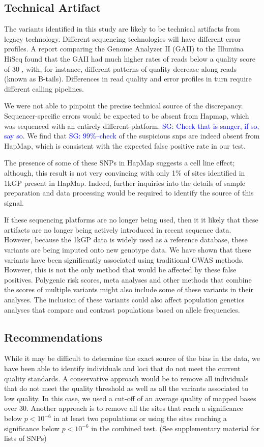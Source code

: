 \documentclass[9pt,lineno]{elife}
\newcommand{\sgcomment}[1]{\textcolor{blue}{SG: #1}}
\begin{document}
\subsection{Technical Artifact}
The variants identified in this study are likely to be technical artifacts from legacy technology.
Different sequencing technologies will have different error profiles. 
A report comparing the Genome Analyzer II (GAII) to the Illumina HiSeq found that the GAII had much higher rates of reads below a quality score of 30 \citep{Minoche2011}, with, for instance, different patterns of quality decrease along reads (known as B-tails). 
Differences in read quality and error profiles in turn require different calling pipelines.

We were not able to pinpoint the precise technical source of the discrepancy. Sequencer-specific errors would be expected to be absent from Hapmap, which was sequenced with an entirely different platform. \sgcomment{Check that is sanger, if so, say so}. We find that \sgcomment{$99\%$--check} of the suspicious snps are indeed absent from HapMap, which is consistent with the expected false positive rate in our test.   
  
The presence of some of these SNPs in HapMap suggests a cell line effect; although, this result is not very convincing with only 1\% of sites identified in 1kGP present in HapMap.
Indeed, further inquiries into the details of sample preparation and data processing would be required to identify the source of this signal. 

If these sequencing platforms are no longer being used, then it it likely that these artifacts are no longer being actively introduced in recent sequence data.
However, because the 1kGP data is widely used as a reference database, these variants are being imputed onto new genotype data.
We have shown that these variants have been significantly associated using traditional GWAS methods.
However, this is not the only method that would be affected by these false positives. 
Polygenic risk scores, meta analyses and other methods that combine the scores of multiple variants might also include some of these variants in their analyses.
The inclusion of these variants could also affect population genetics analyses that compare and contrast populations based on allele frequencies.


\subsection{Recommendations}
While it may be difficult to determine the exact source of the bias in the data, we have been able to identify individuals and loci that do not meet the current quality standards.
A conservative approach would be to remove all individuals that do not meet the quality threshold as well as all the variants associated to low quality.
In this case, we used a cut-off of an average quality of mapped bases over 30.
Another approach is to remove all the sites that reach a significance below $ p < 10^{-6}$ in at least two populations or using the sites reaching a significance below $ p < 10^{-6}$ in the combined test. (See supplementary material for lists of SNPs)
\end{document}
